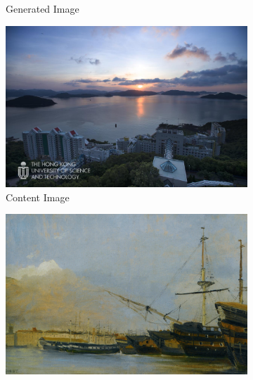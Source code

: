 \documentclass{article}
\begin{document}
\begin{figure}[ht]
\begin{minipage}{\textwidth}
\begin{subfigure}{0.25\textwidth}
            \caption{Generated Image}
        \end{subfigure}
    \end{minipage}
    
    \vspace{0.1cm} %
    
    \begin{minipage}{\textwidth}
        \centering
        \begin{subfigure}{0.25\textwidth}
            \includegraphics[width=\textwidth]{./data_set/HKUST/2.jpg}
            \caption{Content Image}
        \end{subfigure}
        \hfill %
        \begin{subfigure}{0.25\textwidth}
            \includegraphics[width=\textwidth]{./wikiart/Realism/camille-corot_toulon-battleships-dismantled.jpg}

\end{subfigure}
\end{minipage}
\end{figure}
\end{document}
